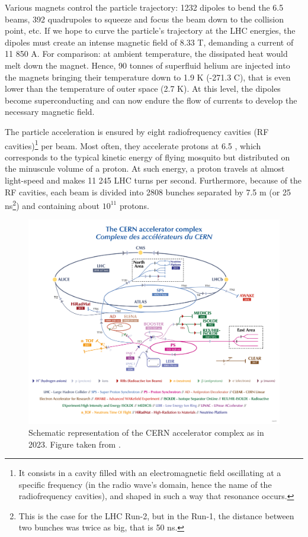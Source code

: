 Various magnets control the particle trajectory: 1232 dipoles to bend the 6.5 \tev beams, 392 quadrupoles to squeeze and focus the beam down to the collision point, etc. If we hope to curve the particle's trajectory at the LHC energies, the dipoles must create an intense magnetic field of 8.33 T, demanding a current of 11 850 A. For comparison: at ambient temperature, the dissipated heat would melt down the magnet. Hence, 90 tonnes of superfluid helium are injected into the magnets bringing their temperature down to 1.9 K (-271.3 C), that is even lower than the temperature of outer space (2.7 K). At this level, the dipoles become superconducting and can now endure the flow of currents to develop the necessary magnetic field. 

The particle acceleration is ensured by eight radiofrequency cavities (RF cavities)\footnote{It consists in a cavity filled with an electromagnetic field oscillating at a specific frequency (in the radio wave's domain, hence the name of the radiofrequency cavities), and shaped in such a way that resonance occurs.} per beam. Most often, they accelerate protons at 6.5 \tev, which corresponds to the typical kinetic energy of flying mosquito but distributed on the minuscule volume of a proton. At such energy, a proton travels at almost light-speed and makes 11 245 LHC turns per second. Furthermore, because of the RF cavities, each beam is divided into 2808 bunches separated by 7.5 m (or 25 ns\footnote{This is the case for the LHC Run-2, but in the Run-1, the distance between two bunches was twice as big, that is 50 ns.}) and containing about $10^{11}$ protons. \\

\begin{figure}[t]
	\centering
	\includegraphics[width=1\textwidth]{Figs/Chapter3/CCC-v2022_Large.png}
	\caption{Schematic representation of the CERN accelerator complex as in 2023. Figure taken from \cite{lopienskaewaCERNAcceleratorComplex2022}.}
	\label{fig:AcceleratorComplex}
\end{figure}

